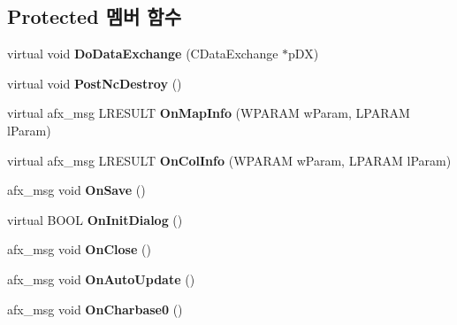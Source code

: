 \subsection*{Protected 멤버 함수}
\begin{DoxyCompactItemize}
\item 
\mbox{\label{class_g_b_tile_view_a6f6a323365040d7675c035b26fdecd9f}} 
virtual void {\bfseries Do\+Data\+Exchange} (C\+Data\+Exchange $\ast$p\+DX)
\item 
\mbox{\label{class_g_b_tile_view_a2bc3fcd50b001a8c3ed3a592772eeb8b}} 
virtual void {\bfseries Post\+Nc\+Destroy} ()
\item 
\mbox{\label{class_g_b_tile_view_a865e1fe72caf57cc6d55700bfdac0a84}} 
virtual afx\+\_\+msg L\+R\+E\+S\+U\+LT {\bfseries On\+Map\+Info} (W\+P\+A\+R\+AM w\+Param, L\+P\+A\+R\+AM l\+Param)
\item 
\mbox{\label{class_g_b_tile_view_a6d47aa6bfc46f3d698272efb7da79dc4}} 
virtual afx\+\_\+msg L\+R\+E\+S\+U\+LT {\bfseries On\+Col\+Info} (W\+P\+A\+R\+AM w\+Param, L\+P\+A\+R\+AM l\+Param)
\item 
\mbox{\label{class_g_b_tile_view_a97f989bc4a5f5872258b5d8d47ae60d0}} 
afx\+\_\+msg void {\bfseries On\+Save} ()
\item 
\mbox{\label{class_g_b_tile_view_a4d97fe7dcfd863756d993834548d2ca6}} 
virtual B\+O\+OL {\bfseries On\+Init\+Dialog} ()
\item 
\mbox{\label{class_g_b_tile_view_a59304e229d01ff07e7e232389d19017b}} 
afx\+\_\+msg void {\bfseries On\+Close} ()
\item 
\mbox{\label{class_g_b_tile_view_ad31fb32f27279e00c296717013144d33}} 
afx\+\_\+msg void {\bfseries On\+Auto\+Update} ()
\item 
\mbox{\label{class_g_b_tile_view_afb45c55e706bed1468f547510490fa2a}} 
afx\+\_\+msg void {\bfseries On\+Charbase0} ()
\item 
\mbox{\label{class_g_b_tile_view_a9d5c6de9e7d359cf221b164f51cb6a18}} 

\end{DoxyCompactItemize}
